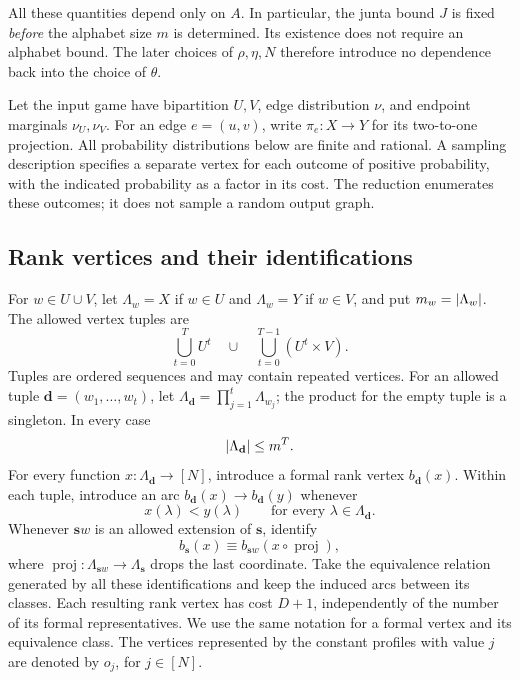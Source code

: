 All these quantities depend only on $A$.  In particular, the junta bound
$J$ is fixed \emph{before} the alphabet size $m$ is determined.  Its existence
does not require an alphabet bound.  The later choices of $\rho,\eta,N$
therefore introduce no dependence back into the choice of $\theta$.

Let the input game have bipartition $U,V$, edge distribution $\nu$, and
endpoint marginals $\nu_U,\nu_V$.  For an edge $e=(u,v)$, write
$\pi_e:X\to Y$ for its two-to-one projection.  All probability distributions
below are finite and rational.  A sampling description specifies a separate
vertex for each outcome of positive probability, with the indicated
probability as a factor in its cost.  The reduction enumerates these outcomes;
it does not sample a random output graph.

\subsection{Rank vertices and their identifications}

\begin{definition}
\label{def:rank-graph}
For $w\in U\cup V$, let $\Lambda_w=X$ if $w\in U$ and $\Lambda_w=Y$ if
$w\in V$, and put $m_w=\lvert\Lambda_w\rvert$.  The allowed vertex tuples are
\[
  \bigcup_{t=0}^{T}U^t
  \quad\cup\quad
  \bigcup_{t=0}^{T-1}(U^t\times V).
\]
Tuples are ordered sequences and may contain repeated vertices.  For an
allowed tuple $\mathbf d=(w_1,\ldots,w_t)$, let
$\Lambda_{\mathbf d}=\prod_{j=1}^t\Lambda_{w_j}$; the product for the empty
tuple is a singleton.  In every case
\begin{equation}
  \lvert\Lambda_{\mathbf d}\rvert\le m^T.
  \label{eq:tuple-domain-bound}
\end{equation}
For every function $x:\Lambda_{\mathbf d}\to[N]$, introduce a formal rank
vertex $b_{\mathbf d}(x)$.  Within each tuple, introduce an arc
$b_{\mathbf d}(x)\to b_{\mathbf d}(y)$ whenever
\[
  x(\lambda)<y(\lambda)
  \qquad\text{for every }\lambda\in\Lambda_{\mathbf d}.
\]
Whenever $\mathbf s w$ is an allowed extension of $\mathbf s$, identify
\begin{equation}
  b_{\mathbf s}(x)
  \equiv b_{\mathbf s w}(x\circ\operatorname{proj}),
  \label{eq:prefix-identification}
\end{equation}
where $\operatorname{proj}:\Lambda_{\mathbf s w}\to\Lambda_{\mathbf s}$
drops the last coordinate.  Take the equivalence relation generated by all
these identifications and keep the induced arcs between its classes.  Each
resulting rank vertex has cost $D+1$, independently of the number of its
formal representatives.  We use the same notation for a formal vertex and
its equivalence class.  The vertices represented by the constant profiles
with value $j$ are denoted by $o_j$, for $j\in[N]$.
\end{definition}

